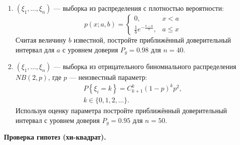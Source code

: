 \documentclass[a4paper,12pt]{article}
\newcommand{\probability}[1]{P \left\{ #1 \right\}}
\newcommand{\sample}[2]{\left( #1_1, \dots, #1_{#2} \right)}
\newcommand{\theme}[1]{\hfil \textbf{#1} \hfil}
\begin{document}
\begin{enumerate}[topsep=1cm, parsep=1cm, resume]
        \item $\sample{\xi}{n}$ --- выборка из распределения с плотностью вероятности:
              \[
                  p(x; a, b)
                  = \left \{
                  \begin{array}{ll}
                      0,                              & x < a   \\
                      \frac{1}{b} e^{-\frac{x-a}{b}}, & a \le x
                  \end{array}
                  \right .
              \]
              Считая величину $b$ известной, постройте приближённый доверительный интервал для $a$ с уровнем доверия $P_g = 0.98$ для $n = 40$.

        \item $\sample{\xi}{n}$ --- выборка из отрицательного биномиального распределения $NB(2,p)$, где $p$ --- неизвестный параметр:
              \begin{gather*}
                  \probability{\xi_i = k} = C_{k+1}^k (1-p)^k p^2 , \\
                  k \in \{0, 1, 2, \dots \} .
              \end{gather*}
              Используя оценку параметра постройте приближённый доверительный интервал с уровнем доверия $P_g = 0.95$ для $n=50$.
    \end{enumerate}

    \theme{Проверка гипотез (хи-квадрат).}
\end{document}
